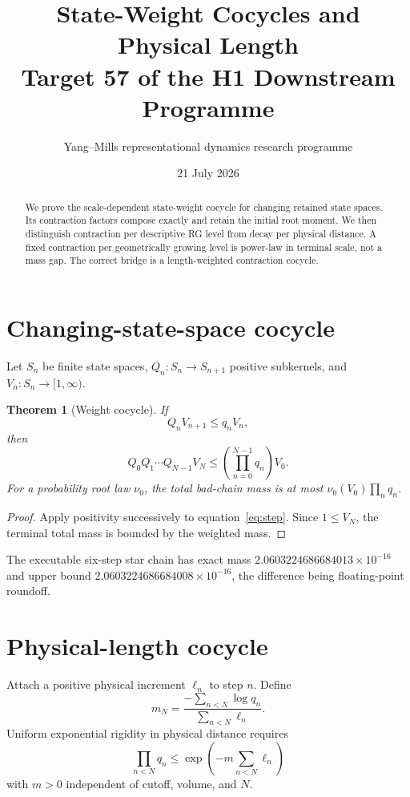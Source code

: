 \documentclass[11pt]{article}
\title{State-Weight Cocycles and Physical Length\\Target 57 of the H1 Downstream Programme}
\author{Yang--Mills representational dynamics research programme}
\date{21 July 2026}
\newtheorem{theorem}{Theorem}
\begin{document}
\maketitle
\begin{abstract}
We prove the scale-dependent state-weight cocycle for changing retained state
spaces.  Its contraction factors compose exactly and retain the initial root
moment.  We then distinguish contraction per descriptive RG level from decay
per physical distance.  A fixed contraction per geometrically growing level
is power-law in terminal scale, not a mass gap.  The correct bridge is a
length-weighted contraction cocycle.
\end{abstract}

\section{Changing-state-space cocycle}
Let $S_n$ be finite state spaces, $Q_n:S_n\to S_{n+1}$ positive subkernels,
and $V_n:S_n\to[1,\infty)$.
\begin{theorem}[Weight cocycle]
If
\begin{equation}\label{eq:step}
 Q_nV_{n+1}\leq q_nV_n,
\end{equation}
then
\[
 Q_0Q_1\cdots Q_{N-1}V_N
 \leq\left(\prod_{n=0}^{N-1}q_n\right)V_0.
\]
For a probability root law $\nu_0$, the total bad-chain mass is at most
$\nu_0(V_0)\prod_nq_n$.
\end{theorem}
\begin{proof}
Apply positivity successively to equation~\eqref{eq:step}.  Since $1\leq V_N$,
the terminal total mass is bounded by the weighted mass.
\end{proof}

The executable six-step star chain has exact mass
$2.0603224686684013\times10^{-16}$ and upper bound
$2.0603224686684008\times10^{-16}$, the difference being floating-point
roundoff.

\section{Physical-length cocycle}
Attach a positive physical increment $\ell_n$ to step $n$.  Define
\[
 m_N=\frac{-\sum_{n<N}\log q_n}{\sum_{n<N}\ell_n}.
\]
Uniform exponential rigidity in physical distance requires
\begin{equation}\label{eq:mass}
 \prod_{n<N}q_n\leq
 \exp\left(-m\sum_{n<N}\ell_n\right)
\end{equation}
with $m>0$ independent of cutoff, volume, and $N$.
\end{document}
